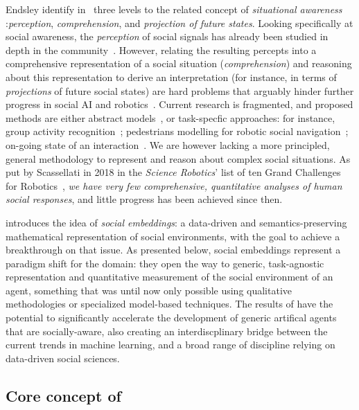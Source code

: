 Endsley identify in~\cite{endsley1995theory} three levels to the related concept
of \textit{situational awareness} :\emph{perception}, \emph{comprehension}, and
\emph{projection of future states}. Looking specifically at social awareness,
the \emph{perception} of social signals has already been studied in depth in the
community~\cite{pantic2011social,vinciarelli2009social}.  However, relating the
resulting percepts into a comprehensive representation of a social situation
(\emph{comprehension}) and reasoning about this representation to derive an
interpretation (for instance, in terms of \emph{projections} of future social
states) are hard problems that arguably hinder further progress in social AI and
robotics~\cite{yang2018grand}. Current research is fragmented, and proposed
methods are either abstract models~\cite{gordon2016commonsense}, or task-specfic
approaches: for instance, group activity
recognition~\cite{shu2017cern,wu2019learning}; pedestrians modelling for robotic
social navigation~\cite{alahi2016social}; on-going state of an
interaction~\cite{garcía2020explainable}. We are however lacking a more
principled, general methodology to represent and reason about complex social
situations. As put by Scassellati in 2018 in the \emph{Science Robotics}' list of
ten Grand Challenges for Robotics~\cite{yang2018grand}, \emph{we have very few
comprehensive, quantitative analyses of human social responses}, and little
progress has been achieved since then.

\project introduces the idea of \emph{social embeddings}: a data-driven and
semantics-preserving mathematical representation of social environments, with
the goal to achieve a breakthrough on that issue.  As presented below, social
embeddings represent a paradigm shift for the domain: they open the way to
generic, task-agnostic representation and quantitative measurement of the social
environment of an agent, something that was until now only possible using
qualitative methodologies or specialized model-based techniques. The
results of \project have the potential to significantly accelerate the
development of generic artifical agents that are socially-aware, also creating
an interdiscplinary bridge between the current trends in machine learning, and
a broad range of discipline relying on data-driven social sciences.


\subsection{Core concept of \project}

